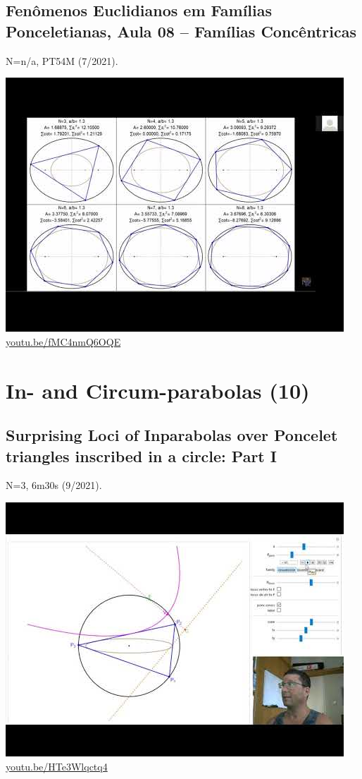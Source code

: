 \documentclass[12pt]{amsart}
\begin{document}
\subsection{Fenômenos Euclidianos em Famílias Ponceletianas, Aula 08 -- Famílias Concêntricas}
\label{vid:fMC4nmQ6OQE}
\noindent N=n/a, PT54M (7/2021). 
\begin{center}\includegraphics[width=.5\textwidth]{pics/fMC4nmQ6OQE.jpg} \\ 
\href{https://youtu.be/fMC4nmQ6OQE}{\url{youtu.be/fMC4nmQ6OQE}}\end{center}
% 


\section{In- and Circum-parabolas (10)}

\subsection{Surprising Loci of Inparabolas over Poncelet triangles inscribed in a circle: Part I}
\label{vid:HTe3Wlqctq4}
\noindent N=3, 6m30s (9/2021). 
\begin{center}\includegraphics[width=.5\textwidth]{pics/HTe3Wlqctq4.jpg} \\ 
\href{https://youtu.be/HTe3Wlqctq4}{\url{youtu.be/HTe3Wlqctq4}}\end{center}
% 
\end{document}

